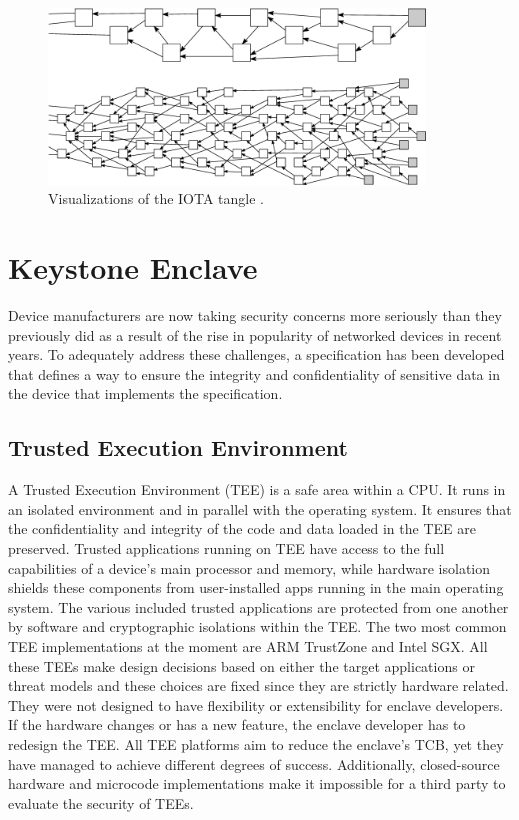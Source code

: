 \begin{figure}[h!]
    \centering
    \includegraphics[width=10cm]{./chapters/images/tangle.png}
    \caption{Visualizations of the IOTA tangle \cite{popov2018tangle}.}
    \label{tangleFigure}
\end{figure}


\section{Keystone Enclave}
Device manufacturers are now taking security concerns more seriously than they previously did as a result of the rise in popularity of networked devices in recent years.
To adequately address these challenges, a specification has been developed that defines a way to ensure the integrity and confidentiality of sensitive data in the device that implements the specification.
\cite{IntroTEE}
\subsection{Trusted Execution Environment}
A Trusted Execution Environment (TEE) is a safe area within a CPU. It runs in an isolated environment and in parallel with the operating system.
It ensures that the confidentiality and integrity of the code and data loaded in the TEE are preserved. 
Trusted applications running on TEE have access to the full capabilities of a device's main processor and memory, while hardware isolation shields these components from user-installed apps running in the main operating system. The various included trusted applications are protected from one another by software and cryptographic isolations within the TEE.
\cite{IntroTEE}
The two most common TEE implementations at the moment are ARM TrustZone and Intel SGX. All these TEEs make design decisions based on either the target applications or threat models and these choices are fixed since they are strictly hardware related. They were not designed to have flexibility or extensibility for enclave developers.  If the hardware changes or has a new feature, the enclave developer has to redesign the TEE.
All TEE platforms aim to reduce the enclave's TCB, yet they have managed to achieve different degrees of success. Additionally, closed-source hardware and microcode implementations make it impossible for a third party to evaluate the security of TEEs.



